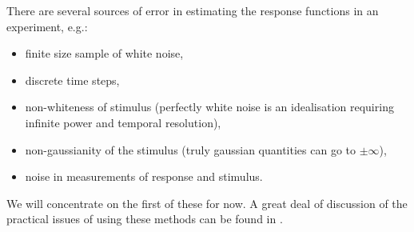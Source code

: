 \documentclass[12pt]{article}
\begin{document}
There are several sources of error in estimating the response functions in an experiment, e.g.:
\begin{itemize}
  \item finite size sample of white noise,
  \item discrete time steps,
  \item non-whiteness of stimulus (perfectly white noise is an idealisation requiring infinite power and temporal resolution),
  \item non-gaussianity of the stimulus (truly gaussian quantities can go to $\pm\infty$),
  \item noise in measurements of response and stimulus.
\end{itemize}
We will concentrate on the first of these for now.
A great deal of discussion of the practical issues of using these methods can be found in \cite{Marmerelis:1978}.
\end{document}
